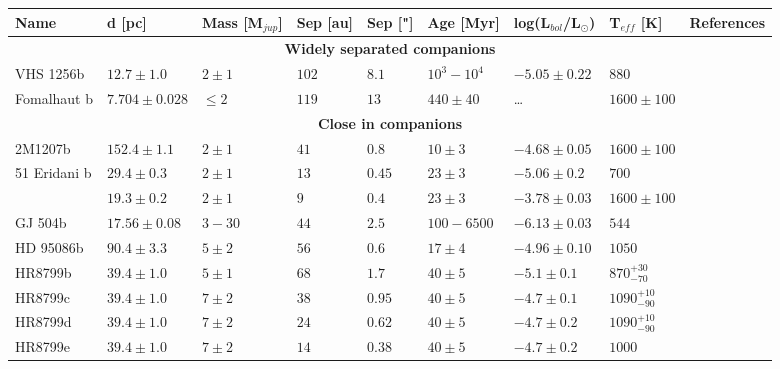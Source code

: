\begin{landscape}
\begin{table}[t]
	\centering
	\begin{small}
	\begin{tabular}{lllllllll}
		\toprule
		\textbf{Name} & \textbf{d [pc]} & \textbf{Mass [M$_{jup}$]} & \textbf{Sep [au]} & \textbf{Sep ["]} & \textbf{Age [Myr]} & \textbf{log(L$_{bol}$/L$_{\odot}$)} & \textbf{T$_{eff}$ [K]} & \textbf{References}\\
		\midrule
		\multicolumn{9}{c}{\textbf{Widely separated companions}}\\
		\midrule
		VHS 1256b & $12.7\pm1.0$  & $2\pm1$     & $102$ & $8.1$ & $10^{3}-10^{4}$ & $-5.05\pm0.22$ & $880$ & \parencite{Gauza2015}\\
		Fomalhaut b & $7.704\pm0.028$ & $\leq 2$ & $119$ & $13$ & $440\pm40$ & \ldots & $1600\pm100$ &\\
		\midrule
		\multicolumn{9}{c}{\textbf{Close in companions}}\\
		\midrule
		2M1207b   & $152.4\pm1.1$ & $2\pm1$     & $41$ & $0.8$ & $10\pm3$ & $-4.68\pm0.05$ & $1600\pm100$ &\\
		51 Eridani b & $29.4\pm0.3$ & $2\pm1$   & $13$ & $0.45$ & $23\pm3$ & $-5.06\pm0.2$ & $700$ &  \parencite{Macintosh2015}\\
		\bpic     & $19.3\pm0.2$  & $2\pm1$     & $9$ & $0.4$ & $23\pm3$ & $-3.78\pm0.03$ & $1600\pm100$ & \parencite{Quanz2010}\\
		GJ 504b   & $17.56\pm0.08$  & $3-30$    & $44$ & $2.5$ & $100-6500$ & $-6.13\pm0.03$ & $544$ & \parencite{Skemer2016}\\
		HD 95086b & $90.4\pm3.3$  & $5\pm2$     & $56$ & $0.6$ & $17\pm4$ & $-4.96\pm0.10$ & $1050$  &\parencite{DeRosa2016}\\	
		HR8799b   & $39.4\pm1.0$  & $5\pm1$     & $68$ & $1.7$ & $40\pm5$ & $-5.1\pm0.1$ & $870^{+30}_{-70}$ & \parencite{Marois2008,Skemer2012}\\
		HR8799c   & $39.4\pm1.0$  & $7\pm2$     & $38$ & $0.95$ & $40\pm5$ & $-4.7\pm0.1$ & $1090^{+10}_{-90}$ &\parencite{Marois2008,Skemer2012}\\
		HR8799d   & $39.4\pm1.0$  & $7\pm2$     & $24$ & $0.62$ & $40\pm5$ & $-4.7\pm0.2$ & $1090^{+10}_{-90}$ &\parencite{Marois2008,Skemer2012}\\
		HR8799e   & $39.4\pm1.0$  & $7\pm2$     & $14$ & $0.38$ & $40\pm5$ & $-4.7\pm0.2$ & $1000$ &\parencite{Marois2008,Skemer2012}\\	

\end{tabular}
\end{small}
\end{table}
\end{landscape}
